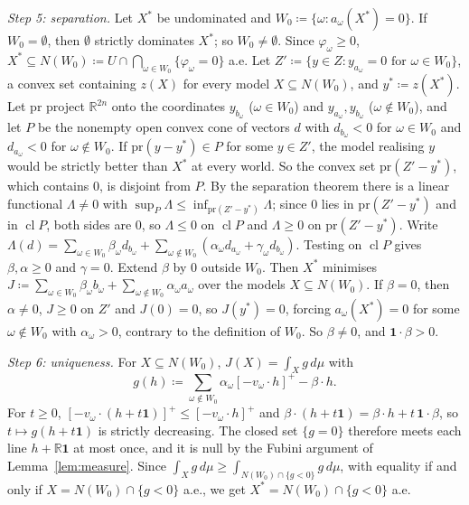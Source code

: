 \documentclass[11pt]{article}
\newcommand{\R}{\mathbb{R}}
\newcommand{\one}{\mathbf{1}}
\DeclareMathOperator{\cl}{cl}
\theoremstyle{plain}
\theoremstyle{definition}
\theoremstyle{remark}
\begin{document}
\emph{Step 5: separation.} Let $X^\ast$ be undominated and $W_0\coloneqq\{\omega:a_\omega(X^\ast)
=0\}$. If $W_0=\emptyset$, then $\emptyset$ strictly dominates $X^\ast$; so $W_0\ne\emptyset$.
Since $\varphi_\omega\ge0$, $X^\ast\subseteq N(W_0)\coloneqq U\cap\bigcap_{\omega\in W_0}
\{\varphi_\omega=0\}$ a.e. Let $Z'\coloneqq\{y\in Z:y_{a_\omega}=0\text{ for }\omega\in W_0\}$,
a convex set containing $z(X)$ for every model $X\subseteq N(W_0)$, and $y^\ast\coloneqq
z(X^\ast)$. Let $\mathrm{pr}$ project $\R^{2n}$ onto the coordinates $y_{b_\omega}$ ($\omega\in
W_0$) and $y_{a_\omega},y_{b_\omega}$ ($\omega\notin W_0$), and let $P$ be the nonempty open
convex cone of vectors $d$ with $d_{b_\omega}<0$ for $\omega\in W_0$ and $d_{a_\omega}<0$ for
$\omega\notin W_0$. If $\mathrm{pr}(y-y^\ast)\in P$ for some $y\in Z'$, the model realising $y$
would be strictly better than $X^\ast$ at every world. So the convex set $\mathrm{pr}(Z'-y^\ast)$,
which contains $0$, is disjoint from $P$. By the separation theorem
\cite[Thm.~11.3]{Rockafellar} there is a linear functional $\Lambda\ne0$ with $\sup_P\Lambda
\le\inf_{\mathrm{pr}(Z'-y^\ast)}\Lambda$; since $0$ lies in $\mathrm{pr}(Z'-y^\ast)$ and in
$\cl P$, both sides are $0$, so $\Lambda\le0$ on $\cl P$ and $\Lambda\ge0$ on
$\mathrm{pr}(Z'-y^\ast)$. Write $\Lambda(d)=
\sum_{\omega\in W_0}\beta_\omega d_{b_\omega}+\sum_{\omega\notin W_0}(\alpha_\omega d_{a_\omega}+
\gamma_\omega d_{b_\omega})$. Testing on $\cl P$ gives $\beta,\alpha\ge0$ and $\gamma=0$. Extend
$\beta$ by $0$ outside $W_0$. Then $X^\ast$ minimises $J\coloneqq\sum_{\omega\in W_0}\beta_\omega
b_\omega+\sum_{\omega\notin W_0}\alpha_\omega a_\omega$ over the models $X\subseteq N(W_0)$. If
$\beta=0$, then $\alpha\ne0$, $J\ge0$ on $Z'$ and $J(0)=0$, so $J(y^\ast)=0$, forcing
$a_\omega(X^\ast)=0$ for some $\omega\notin W_0$ with $\alpha_\omega>0$, contrary to the
definition of $W_0$. So $\beta\ne0$, and $\one\cdot\beta>0$.

\emph{Step 6: uniqueness.} For $X\subseteq N(W_0)$, $J(X)=\int_Xg\,d\mu$ with
\[
  g(h)\coloneqq\sum_{\omega\notin W_0}\alpha_\omega[-v_\omega\cdot h]^+-\beta\cdot h .
\]
For $t\ge0$, $[-v_\omega\cdot(h+t\one)]^+\le[-v_\omega\cdot h]^+$ and $\beta\cdot(h+t\one)=
\beta\cdot h+t\,\one\cdot\beta$, so $t\mapsto g(h+t\one)$ is strictly decreasing. The closed set
$\{g=0\}$ therefore meets each line $h+\R\one$ at most once, and it is null by the Fubini
argument of Lemma~\ref{lem:measure}. Since $\int_Xg\,d\mu\ge\int_{N(W_0)\cap\{g<0\}}g\,d\mu$, with
equality if and only if $X=N(W_0)\cap\{g<0\}$ a.e., we get $X^\ast=N(W_0)\cap\{g<0\}$ a.e.
\end{document}
